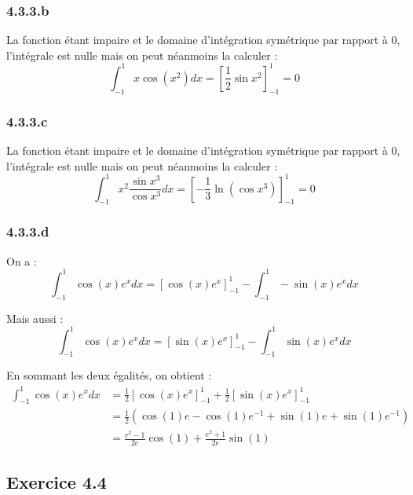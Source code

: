 \documentclass[a4paper,10pt]{report}
\begin{document}
\subsubsection*{4.3.3.b}
La fonction étant impaire et le domaine d'intégration symétrique par rapport à $0$, l'intégrale
est nulle mais on peut néanmoins la calculer :
\begin{displaymath}
	\int_{-1}^1 x\cos(x^2)dx = \left[ \frac{1}{2}\sin x^2 \right]_{-1}^1 = 0
\end{displaymath}

\subsubsection*{4.3.3.c}
La fonction étant impaire et le domaine d'intégration symétrique par rapport à $0$, l'intégrale
est nulle mais on peut néanmoins la calculer :
\begin{displaymath}
	\int_{-1}^1 x^2 \frac{\sin x^3}{\cos x^3} dx = \left[ -\frac{1}{3}\ln(\cos x^3) \right]_{-1}^1= 0
\end{displaymath}

\subsubsection*{4.3.3.d}

On a :
\begin{displaymath}
	\int_{-1}^1 \cos(x)e^x dx = \left[ \cos(x)e^x \right]_{-1}^1 - \int_{-1}^1 -\sin(x)e^x dx
\end{displaymath}

Mais aussi :
\begin{displaymath}
	\int_{-1}^1 \cos(x)e^x dx = \left[ \sin(x)e^x \right]_{-1}^1 - \int_{-1}^1 \sin(x)e^x dx
\end{displaymath}

En sommant les deux égalités, on obtient :
\begin{equation*}
	\begin{split}
	\int_{-1}^1 \cos(x)e^x dx &= \frac{1}{2}\left[ \cos(x)e^x \right]_{-1}^1 +  \frac{1}{2}\left[ \sin(x)e^x \right]_{-1}^1 \\
                              &= \frac{1}{2} (\cos(1)e - \cos(1)e^{-1} + \sin(1) e + \sin(1)e^{-1}) \\
                              &= \frac{e^2-1}{2e}\cos(1) + \frac{e^2+1}{2e} \sin(1)
	\end{split}
\end{equation*}

\subsection*{Exercice 4.4}
\end{document}
